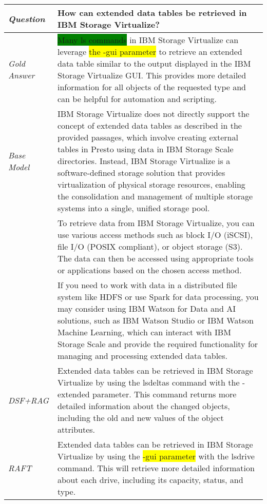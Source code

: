\begin{table}
	\centering
	\renewcommand{\arraystretch}{1.5}
	\begin{tabular}{l|p{13cm}}
	\toprule
 \textit{Question}&How can extended data tables be retrieved in IBM Storage Virtualize?\\ \midrule
 \textit{Gold Answer}& \colorbox{green}{Many ls commands} in IBM Storage Virtualize can leverage \colorbox{yellow}{the -gui parameter} to retrieve an extended data table similar to the output displayed in the IBM Storage Virtualize GUI. This provides more detailed information for all objects of the requested type and can be helpful for automation and scripting. \\ \midrule
 \textit{Base Model} & IBM Storage Virtualize does not directly support the concept of extended data tables as described in the provided passages, which involve creating external tables in Presto using data in IBM Storage Scale directories. Instead, IBM Storage Virtualize is a software-defined storage solution that provides virtualization of physical storage resources, enabling the consolidation and management of multiple storage systems into a single, unified storage pool.\\
  & To retrieve data from IBM Storage Virtualize, you can use various access methods such as block I/O (iSCSI), file I/O (POSIX compliant), or object storage (S3). The data can then be accessed using appropriate tools or applications based on the chosen access method.\\ 
 & If you need to work with data in a distributed file system like HDFS or use Spark for data processing, you may consider using IBM Watson for Data and AI solutions, such as IBM Watson Studio or IBM Watson Machine Learning, which can interact with IBM Storage Scale and provide the required functionality for managing and processing extended data tables.\\ \midrule
\textit{DSF+RAG} & Extended data tables can be retrieved in IBM Storage Virtualize by using the lsdeltas command with the -extended parameter. This command returns more detailed information about the changed objects, including the old and new values of the object attributes. \\ \midrule
\textit{RAFT} & Extended data tables can be retrieved in IBM Storage Virtualize by using the \colorbox{yellow}{-gui parameter} with the lsdrive command. This will retrieve more detailed information about each drive, including its capacity, status, and type. \\ \midrule

\end{tabular}
\end{table}
